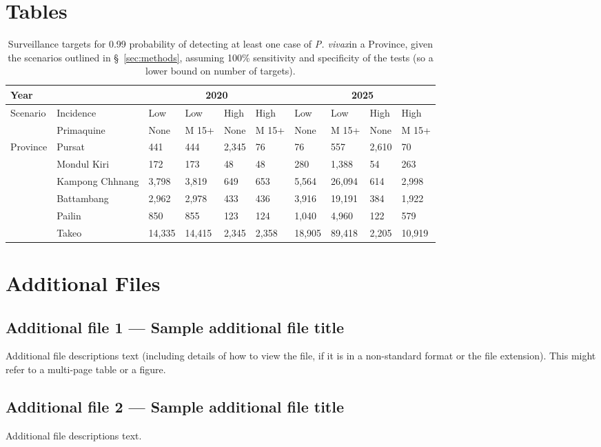 \documentclass[doublespacing]{bmcart}
\newcommand{\pv}{\textit{P. vivax}}
\begin{document}
\begin{backmatter}
\section*{Tables}
\begin{table}[h!]
\caption{Surveillance targets for 0.99 probability of detecting at least one case of \pv in a Province, given the scenarios outlined in \S~\ref{sec:methods}, assuming 100\% sensitivity and specificity of the tests (so a lower bound on number of targets).}
      \begin{tabular}{|l|l|l|l|l|l|l|l|l|l|}
       \hline 
       \multicolumn{2}{|l|}{Year} & \multicolumn{4}{|c|}{2020} & \multicolumn{4}{|c|}{2025} \\ \hline
       \multirow{2}{*}{Scenario} & Incidence & Low & Low & High & High & Low & Low & High & High \\ %
                                 & Primaquine & None & M 15+ & None & M 15+ & None & M 15+ & None & M 15+ \\ \hline
    \multirow{6}{*}{Province} & Pursat & 441 & 444 & 2,345 & 76 & 76 & 557 & 2,610 & 70 \\ %
                              & Mondul Kiri & 172 & 173 & 48 & 48 & 280 & 1,388 & 54 & 263 \\ %
                              & Kampong Chhnang & 3,798 & 3,819 & 649 & 653 & 5,564 & 26,094 & 614 & 2,998 \\ %
                              & Battambang & 2,962 & 2,978 & 433 & 436 & 3,916 & 19,191 & 384 & 1,922 \\ %
                              & Pailin & 850 & 855 & 123 & 124 & 1,040 & 4,960 & 122 & 579 \\ %
                              & Takeo & 14,335 & 14,415 & 2,345 & 2,358 & 18,905 & 89,418 & 2,205 & 10,919 \\ \hline 
      \end{tabular}
\end{table}


\section*{Additional Files}
  \subsection*{Additional file 1 --- Sample additional file title}
    Additional file descriptions text (including details of how to
    view the file, if it is in a non-standard format or the file extension).  This might
    refer to a multi-page table or a figure.

  \subsection*{Additional file 2 --- Sample additional file title}
    Additional file descriptions text.


\end{backmatter}
\end{document}
